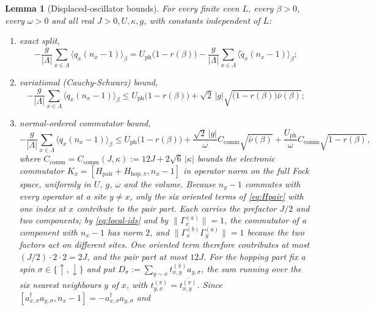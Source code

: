 \documentclass[11pt]{article}
\numberwithin{equation}{section}
\newcommand{\Lamb}{\Lambda}
\newcommand{\hop}{\mathrm{hop}}
\newcommand{\pair}{\mathrm{pair}}
\newcommand{\Gam}{\Gamma}
\newtheorem{lemma}[theorem]{Lemma}
\theoremstyle{definition}
\begin{document}
\begin{lemma}[Displaced-oscillator bounds]\label{lem:ph}
For every finite even $L$, every $\beta>0$, every $\omega>0$ and all real $J>0,U,\kappa,g$,
with constants independent of $L$:
\begin{enumerate}
\item exact split,
  \begin{equation}
  -\frac{g}{|\Lamb|}\sum_{x\in\Lamb}\big\langle q_{x}(n_{x}-1)\big\rangle_{\beta}
  =U_{\mathrm{ph}}\big(1-r(\beta)\big)-\frac{g}{|\Lamb|}\sum_{x\in\Lamb}\big\langle\tilde q_{x}(n_{x}-1)\big\rangle_{\beta};
  \label{eq:split}
  \end{equation}
\item variational (Cauchy-Schwarz) bound,
  \begin{equation}
  -\frac{g}{|\Lamb|}\sum_{x\in\Lamb}\big\langle q_{x}(n_{x}-1)\big\rangle_{\beta}
  \le U_{\mathrm{ph}}\big(1-r(\beta)\big)+\sqrt2\,|g|\sqrt{\big(1-r(\beta)\big)\bar\nu(\beta)};
  \label{eq:cs}
  \end{equation}
\item normal-ordered commutator bound,
  \begin{equation}
  -\frac{g}{|\Lamb|}\sum_{x\in\Lamb}\big\langle q_{x}(n_{x}-1)\big\rangle_{\beta}
  \le U_{\mathrm{ph}}\big(1-r(\beta)\big)+\frac{\sqrt2\,|g|}{\omega}C_{\mathrm{comm}}\sqrt{\bar\nu(\beta)}
  +\frac{U_{\mathrm{ph}}}{\omega}C_{\mathrm{comm}}\sqrt{1-r(\beta)},
  \label{eq:comm}
  \end{equation}
  where $C_{\mathrm{comm}}=C_{\mathrm{comm}}(J,\kappa):=12J+2\sqrt6\,|\kappa|$ bounds
  the electronic commutator $K_{x}=[H_{\pair}+H_{\hop,\pi},n_{x}-1]$ in operator norm on
  the full Fock space, uniformly in $U$, $g$, $\omega$ and the volume. Because
  $n_{y}-1$ commutes with every operator at a site $y\ne x$, only the six oriented terms
  of \eqref{eq:Hpair} with one index at $x$ contribute to the pair part. Each carries the
  prefactor $J/2$ and two components; by \eqref{eq:local-ids} and by
  $\|\Gam^{(a)}_{x}\|=1$, the commutator of a component with $n_{x}-1$ has norm $2$, and
  $\|\Gam^{(b)}_{x}\Gam^{(a)}_{y}\|=1$ because the two factors act on different sites. One
  oriented term therefore contributes at most $(J/2)\cdot2\cdot2=2J$, and the pair part
at most $12J$. For the hopping part fix a spin $\sigma\in\{\uparrow,\downarrow\}$ and put
$D_{\sigma}:=\sum_{y\sim x}t^{(\pi)}_{x,y}a_{y,\sigma}$, the sum running over the six nearest
neighbours $y$ of $x$, with $t^{(\pi)}_{y,x}=\overline{t^{(\pi)}_{x,y}}$. Since
$[a_{x,\sigma}^{\dagger}a_{y,\sigma},n_{x}-1]=-a_{x,\sigma}^{\dagger}a_{y,\sigma}$ and

\end{enumerate}
\end{lemma}
\end{document}
